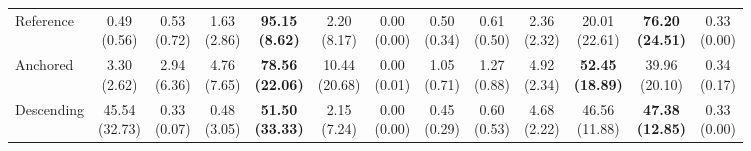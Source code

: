 {\begin{tabular}{l|cccccc|cccccc}
Reference & \makecell{0.49 \\ (0.56)} & \makecell{0.53 \\ (0.72)} & \makecell{1.63 \\ (2.86)} & {\cellcolor[HTML]{C8E6C9}} \bfseries \makecell{95.15 \\ (8.62)} & \makecell{2.20 \\ (8.17)} & \makecell{0.00 \\ (0.00)} & \makecell{0.50 \\ (0.34)} & \makecell{0.61 \\ (0.50)} & \makecell{2.36 \\ (2.32)} & {\cellcolor[HTML]{C8E6C9}} \makecell{20.01 \\ (22.61)} & \bfseries \makecell{76.20 \\ (24.51)} & \makecell{0.33 \\ (0.00)} \\
Anchored & \makecell{3.30 \\ (2.62)} & \makecell{2.94 \\ (6.36)} & \makecell{4.76 \\ (7.65)} & {\cellcolor[HTML]{C8E6C9}} \bfseries \makecell{78.56 \\ (22.06)} & \makecell{10.44 \\ (20.68)} & \makecell{0.00 \\ (0.01)} & \makecell{1.05 \\ (0.71)} & \makecell{1.27 \\ (0.88)} & \makecell{4.92 \\ (2.34)} & {\cellcolor[HTML]{C8E6C9}} \bfseries \makecell{52.45 \\ (18.89)} & \makecell{39.96 \\ (20.10)} & \makecell{0.34 \\ (0.17)} \\
Descending & \makecell{45.54 \\ (32.73)} & \makecell{0.33 \\ (0.07)} & \makecell{0.48 \\ (3.05)} & {\cellcolor[HTML]{C8E6C9}} \bfseries \makecell{51.50 \\ (33.33)} & \makecell{2.15 \\ (7.24)} & \makecell{0.00 \\ (0.00)} & \makecell{0.45 \\ (0.29)} & \makecell{0.60 \\ (0.53)} & \makecell{4.68 \\ (2.22)} & {\cellcolor[HTML]{C8E6C9}} \makecell{46.56 \\ (11.88)} & \bfseries \makecell{47.38 \\ (12.85)} & \makecell{0.33 \\ (0.00)} \\
\bottomrule
\end{tabular}
}%
